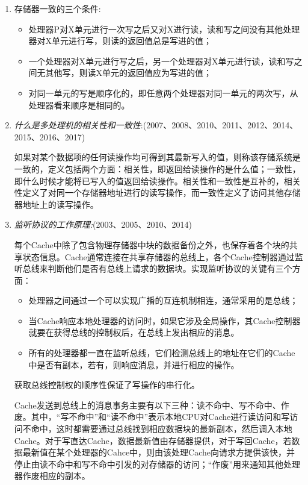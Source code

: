 \documentclass[a4paper]{ctexart}
\begin{document}
\begin{enumerate}
  \item 存储器一致的三个条件:
  \begin{itemize}
    \item 处理器P对X单元进行一次写之后又对X进行读，读和写之间没有其他处理器对X单元进行写，则读的返回值总是写进的值；
    \item 一个处理器对X单元进行写之后，另一个处理器对X单元进行读，读和写之间无其他写，则读X单元的返回值应为写进的值；
    \item 对同一单元的写是顺序化的，即任意两个处理器对同一单元的两次写，从处理器看来顺序是相同的。
  \end{itemize}
  
  \item \emph{什么是多处理机的相关性和一致性}:(2007、2008、2010、2011、2012、2014、2015、2016、2017)
  
  如果对某个数据项的任何读操作均可得到其最新写入的值，则称该存储系统是一致的，定义包括两个方面：相关性，即返回给读操作的是什么值；一致性，即什么时候才能将已写入的值返回给读操作。相关性和一致性是互补的，相关性定义了对同一个存储器地址进行的读写操作，而一致性定义了访问其他存储器地址上的读写操作。
    
  \item \emph{监听协议的工作原理:}(2003、2005、2010、2014)
  
  每个Cache中除了包含物理存储器中块的数据备份之外，也保存着各个块的共享状态信息。Cache通常连接在共享存储器的总线上，各个Cache控制器通过监听总线来判断他们是否有总线上请求的数据块。实现监听协议的关键有三个方面：
  \begin{itemize}
    \item 处理器之间通过一个可以实现广播的互连机制相连，通常采用的是总线；
    \item 当Cache响应本地处理器的访问时，如果它涉及全局操作，其Cache控制器就要在获得总线的控制权后，在总线上发出相应的消息。
    \item 所有的处理器都一直在监听总线，它们检测总线上的地址在它们的Cache中是否有副本，若有，则响应消息，并进行相应的操作。
  \end{itemize}
  获取总线控制权的顺序性保证了写操作的串行化。
  
  Cache发送到总线上的消息事务主要有以下三种：读不命中、写不命中、作废。其中，“写不命中”和“读不命中”表示本地CPU对Cache进行读访问和写访问不命中，这时都需要通过总线找到相应数据块的最新副本，然后调入本地Cache。对于写直达Cache，数据最新值由存储器提供，对于写回Cache，若数据最新值在某个处理器的Cahce中，则由该处理Cache向请求方提供该快，并停止由读不命中和写不命中引发的对存储器的访问；“作废”用来通知其他处理器作废相应的副本。
  

\end{enumerate}
\end{document}
